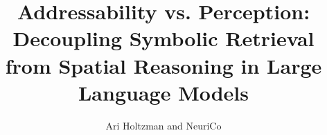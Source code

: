 \documentclass{article}
\title{Addressability vs. Perception: Decoupling Symbolic Retrieval from Spatial Reasoning in Large Language Models}
\author{Ari Holtzman and NeuriCo}
\begin{document}
\maketitle

\begin{abstract}

\end{abstract}









\end{document}
